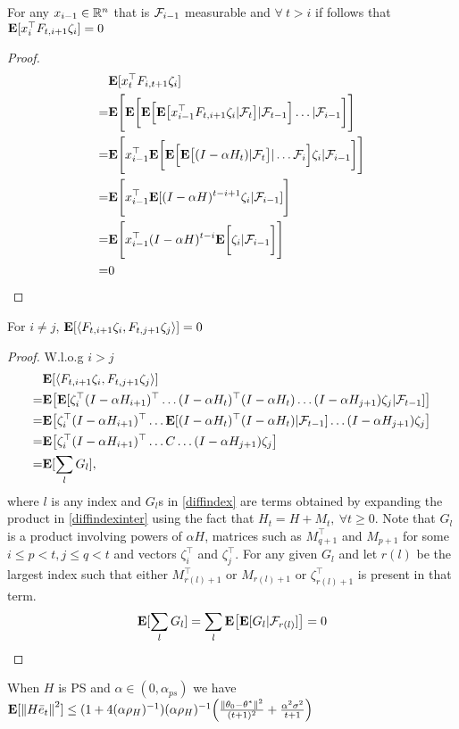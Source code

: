 \begin{lemma}
For any $x_{i-1}\in \mathbb{R}^n$ that is $\mathcal{F}_{i-1}$ measurable and $\forall ~t > i$ if follows that $\mathbf{E}[x_i^\top F_{t,i+1}\zeta_{i}]=0$
\end{lemma}
\small
\begin{proof}
\begin{align*}
&\mathbf{E}[x_t^\top F_{i,t+1}\zeta_{i}]\\
=&\mathbf{E}\Bigg[\mathbf{E}\bigg[\mathbf{E}\Big[\mathbf{E}\big[ x_{i-1}^\top F_{t,i+1}\zeta_{i}|\mathcal{F}_{t}\big]|\mathcal{F}_{t-1}\Big]\ldots|\mathcal{F}_{i-1}\bigg]\Bigg]\\
=&\mathbf{E}\Bigg[ x_{i-1}^\top \mathbf{E}\bigg[\mathbf{E}\Big[\mathbf{E}\big[(I-\alpha H_t)|\mathcal{F}_{t}\big]|\ldots \mathcal{F}_{i}\Big]\zeta_{i}|\mathcal{F}_{i-1}\bigg]\Bigg]\\
=&\mathbf{E}\Bigg[ x_{i-1}^\top \mathbf{E}[(I-\alpha H)^{t-i+1}\zeta_{i}|\mathcal{F}_{i-1}]\Bigg]\\
=&\mathbf{E}\Bigg[ x_{i-1}^\top (I-\alpha H)^{t-i}\mathbf{E}\bigg[\zeta_{i}|\mathcal{F}_{i-1}\bigg]\Bigg]\\
=&0
\end{align*}
\end{proof}

\begin{lemma}
For $i\neq j$, $\mathbf{E}[\langle F_{t,i+1}\zeta_{i},F_{t,j+1} \zeta_{j}\rangle]=0$
\end{lemma}
\begin{proof}
W.l.o.g  $i>j$
\begin{align}
&\mathbf{E}[\langle F_{t,i+1} \zeta_{i},F_{t,j+1} \zeta_{j}\rangle]\nonumber\\
\label{diffindexinter}=&\mathbf{E}\big[\mathbf{E}[ \zeta^\top_{i}(I-\alpha H_{i+1})^\top\ldots(I-\alpha H_t)^\top(I-\alpha H_t)\ldots(I-\alpha H_{j+1}) \zeta_{j}|\mathcal{F}_{t-1}]\big]\\
=&\mathbf{E}\big[ \zeta^\top_{i}(I-\alpha H_{i+1})^\top\ldots\mathbf{E}[(I-\alpha H_t)^\top(I-\alpha H_t)|\mathcal{F}_{t-1}]\ldots(I-\alpha H_{j+1}) \zeta_{j}\big]\\
=&\mathbf{E}\big[ \zeta^\top_{i}(I-\alpha H_{i+1})^\top\ldots C\ldots(I-\alpha H_{j+1}) \zeta_{j}\big]\\
\label{diffindex}=&\mathbf{E}[ \sum_{l} G_l],
\end{align}
where $l$ is any index and $G_l$s in \eqref{diffindex} are terms obtained by expanding the product in \eqref{diffindexinter} using the fact that $H_t=H+M_{t},~\forall t\geq 0$. Note that $G_l$ is a product involving powers of $\alpha H$, matrices such as $M^\top_{q+1}$ and $M_{p+1}$ for some $ i\leq p<t, j\leq q < t$ and vectors $\zeta^\top_i$ and $\zeta^\top_j$.
For any given $G_l$ and let $r(l)$ be the largest index such that either $M^\top_{r(l)+1}$ or $M_{r(l)+1}$ or $\zeta^\top_{r(l)+1}$ is present in that term.
\begin{align*}
\mathbf{E}[ \sum_{l} G_l]=  \sum_{l} \mathbf{E}\big[\mathbf{E}[G_l|\mathcal{F}_{r(l)}]\big]=0
\end{align*}
\end{proof}
\begin{theorem}\label{psmus}
When $H$ is PS and $\alpha\in (0,\alpha_{ps})$ we have $\mathbf{E}[\left\| H\bar{e}_t\right\|^2]\leq (1+4(\alpha\rho_H)^{-1}) (\alpha\rho_H)^{-1} \Big(\frac{\left\| \theta_0-\theta^*\right\|^2}{(t+1)^2}+ \frac{\alpha^2\sigma^2}{t+1} \Big)
$
\end{theorem}

